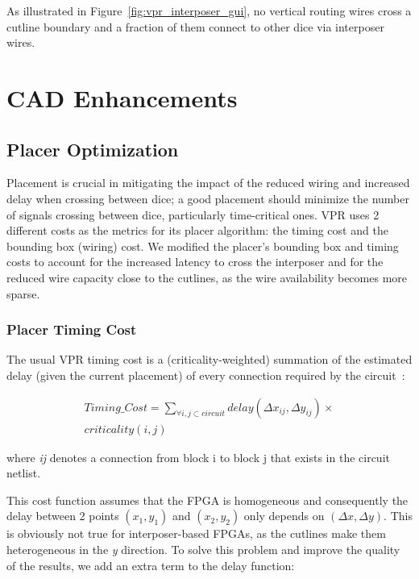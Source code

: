 \documentclass[journal]{IEEEtran}
\begin{document}
As illustrated in Figure~\ref{fig:vpr_interposer_gui}, no vertical routing wires cross a cutline boundary and a fraction of them connect to other dice via interposer wires.


\section{CAD Enhancements}
\label{cadSection}

\subsection{Placer Optimization}
\label{cad_enh_placer_subsection}
Placement is crucial in mitigating the impact of the reduced wiring and increased delay when crossing between dice; a good placement should minimize the number of signals crossing between dice, particularly time-critical ones. VPR uses 2 different costs as the metrics for its placer algorithm: the timing cost and the bounding box (wiring) cost. We modified the placer's bounding box and timing costs to account for the increased latency to cross the interposer and for the reduced wire capacity close to the cutlines, as the wire availability becomes more sparse.

\subsubsection{Placer Timing Cost}
The usual VPR timing cost is a (criticality-weighted) summation of the estimated delay (given the current placement) of every connection required by the circuit~\cite{timing2000}:

 
\setlength{\arraycolsep}{0.0em}
\begin{multline}
\label{eq:timing_eq_full}
Timing\_Cost=\sum_{\forall i, j \subset circuit} delay(\Delta x_{ij},\Delta y_{ij}) \times \\ 
criticality(i,j)
\end{multline}
\setlength{\arraycolsep}{5pt}

where \textit{ij} denotes a connection from block i to block j that exists in the circuit netlist.

This cost function assumes that the FPGA is homogeneous and consequently the delay between 2 points $(x_1,y_1)$ and $(x_2,y_2)$ only depends on $(\Delta x,\Delta y)$. This is obviously not true for interposer-based FPGAs, as the cutlines make them heterogeneous in the \textit{y} direction. To solve this problem and improve the quality of the results, we add an extra term to the delay function:
\end{document}

